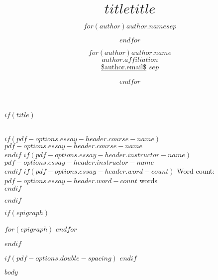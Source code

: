 \documentclass[%
  $if(pdf-options.papersize)$
    $pdf-options.papersize$paper,
  $endif$,
  article,
  $pdf-options.typesize$,
  oneside
  ]{memoir}
\author{$for(author)$$author.name$$sep$ \and $endfor$}
\title{$title$}
\title{\bigskip \bigskip $title$}
\author{$for(author)$\Large $author.name$\\
  \normalsize\emph{$author.affiliation$}\\
  \url{$author.email$}\vspace*{0.2in} $sep$ \and $endfor$}
\renewcommand{\maketitle}{%
    \par\noindent\theauthor\\
    $if(pdf-options.essay-header.course-name)$
      $pdf-options.essay-header.course-name$ \\
    $endif$
    $if(pdf-options.essay-header.instructor-name)$
      $pdf-options.essay-header.instructor-name$ \\
    $endif$
    $if(pdf-options.essay-header.word-count)$
      Word count: $pdf-options.essay-header.word-count$ words \\
    $endif$
    \begin{center}\thetitle\end{center}
    \thispagestyle{title}
   }
\begin{document}
$if(title)$
\maketitle
$endif$

$if(epigraph)$
\begin{epigraphs}
$for(epigraph)$
$endfor$
\end{epigraphs}
$endif$

$if(pdf-options.double-spacing)$
\DoubleSpacing
$endif$

$body$
\end{document}
